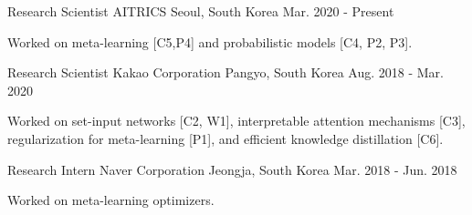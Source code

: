 

\begin{cventries}

  \cventry
    {Research Scientist} %
    {AITRICS} %
    {Seoul, South Korea} %
    {Mar. 2020 - Present} %
    {
      \begin{cvitems} %
        \item {Worked on meta-learning [C5,P4] and probabilistic models [C4, P2, P3].}
      \end{cvitems}
    }

  \cventry
    {Research Scientist} %
    {Kakao Corporation} %
    {Pangyo, South Korea} %
    {Aug. 2018 - Mar. 2020} %
    {
      \begin{cvitems} %
        \item {Worked on set-input networks [C2, W1], interpretable attention mechanisms [C3], regularization for meta-learning [P1], and efficient knowledge distillation [C6].}
      \end{cvitems}
    }

  \cventry
    {Research Intern} %
    {Naver Corporation} %
    {Jeongja, South Korea} %
    {Mar. 2018 - Jun. 2018} %
    {
      \begin{cvitems} %
        \item {Worked on meta-learning optimizers.}
      \end{cvitems}
    }
\end{cventries}
